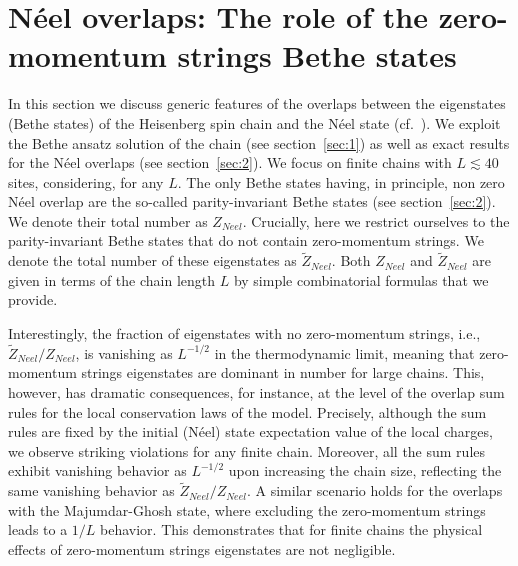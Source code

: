 \documentclass[11pt]{iopart}
\begin{document}
\section{N\'eel overlaps: The role of the zero-momentum strings Bethe states}
\label{sec:5}

In this section we discuss generic features of the overlaps between the 
eigenstates (Bethe states) of the Heisenberg spin chain and the N\'eel state 
(cf.~). We exploit the Bethe ansatz solution of the chain (see 
section~\ref{sec:1}) as well as exact results for the N\'eel overlaps (see 
section~\ref{sec:2}). We focus on finite chains with $L\lesssim 40$ sites, 
considering, for any $L$. The only Bethe states having, in principle, non 
zero N\'eel overlap are the so-called parity-invariant Bethe states (see 
section~\ref{sec:2}). We denote their total number as $Z_{Neel}$. Crucially, 
here we restrict ourselves to the parity-invariant Bethe states that do not 
contain zero-momentum strings. We denote the total number of these eigenstates 
as $\widetilde Z_{Neel}$. Both $Z_{Neel}$ and $\widetilde Z_{Neel}$ are given 
in terms of the chain length $L$ by simple combinatorial formulas that we 
provide. 

Interestingly, the fraction of eigenstates with no zero-momentum strings, i.e.,  
$\widetilde Z_{Neel}/Z_{Neel}$, is vanishing as $L^{-1/2}$ in the thermodynamic 
limit, meaning that zero-momentum strings eigenstates are dominant in number 
for large chains. This, however, has dramatic consequences, for instance, at the 
level of the overlap sum rules for the local conservation laws of the model. 
Precisely, although the sum rules are fixed by the initial (N\'eel) state 
expectation value of the local charges, we observe striking violations for 
any finite chain. Moreover, all the sum rules exhibit vanishing behavior as 
$L^{-1/2}$ upon increasing the chain size, reflecting the same vanishing behavior 
as $\widetilde Z_{Neel}/Z_{Neel}$. A similar scenario holds for the overlaps with 
the Majumdar-Ghosh state, where excluding the zero-momentum strings leads to a $1/L$ 
behavior. This demonstrates that for finite chains the physical effects of 
zero-momentum strings eigenstates are not negligible. 
\end{document}
